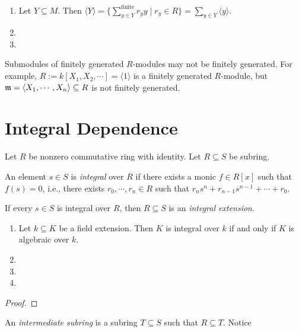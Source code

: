 \begin{fact}
    \begin{enumerate}
        \item Let $Y \subseteq M$. Then $\langle Y \rangle = \{\sum_{y \in Y}^{\text{finite}} r_yy \mid r_y \in R\} = \sum_{y \in Y} \langle y \rangle$.
        \item 
        \item 
    \end{enumerate}
\end{fact}

\begin{example}
    Submodules of finitely generated $R$-modules may not be finitely generated. For example, $R := k[X_1,X_2,\cdots] = \langle 1 \rangle$ is a finitely generated $R$-module, but $\mathfrak{m} = \langle X_1,\cdots,X_n \rangle \subseteq R$ is not finitely generated.
\end{example}

\section{Integral Dependence}

Let $R$ be nonzero commutative ring with identity. Let $R \subseteq S$ be subring.

\begin{definition}
     An element $s \in S$ is \emph{integral} over $R$ if there exists a monic $f \in R[x]$ such that $f(s) = 0$, i.e., there exists $r_0,\cdots,r_n \in R$ such that $r_ns^{n} + r_{n-1}s^{n-1} + \cdots + r_0$. \par 
    If every $s \in S$ is integral over $R$, then $R \subseteq S$ is an \emph{integral extension}.
\end{definition}

\begin{example}
    \begin{enumerate}
        \item Let $k \subseteq K$ be a field extension. Then $K$ is integral over $k$ if and only if $K$ is algebraic over $k$.
        \item
        \item 
        \item 
    \end{enumerate}
\end{example}

\begin{proof}
\end{proof}

\begin{definition}
    An \emph{intermediate subring} is a subring $T \subseteq S$ such that $R \subseteq T$. Notice
\end{definition}

